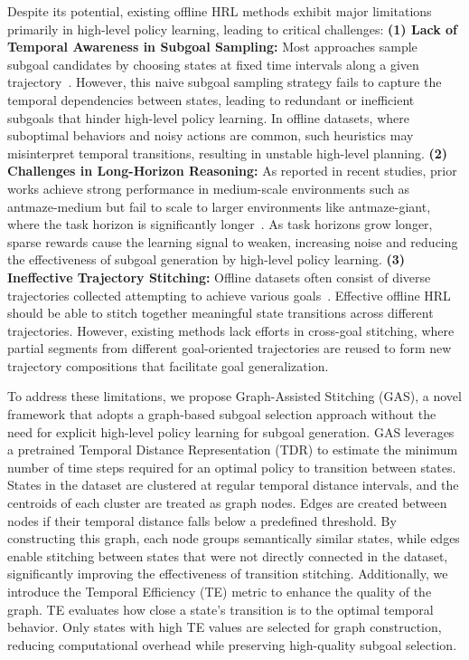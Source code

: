 \documentclass{article}
\begin{document}
Despite its potential, existing offline HRL methods exhibit major limitations primarily in high-level policy learning, leading to critical challenges: \textbf{(1) Lack of Temporal Awareness in Subgoal Sampling:} Most approaches sample subgoal candidates by choosing states at fixed time intervals along a given trajectory~\cite{park2023hiql, shin2023guide}. However, this naive subgoal sampling strategy fails to capture the temporal dependencies between states, leading to redundant or inefficient subgoals that hinder high-level policy learning. In offline datasets, where suboptimal behaviors and noisy actions are common, such heuristics may misinterpret temporal transitions, resulting in unstable high-level planning. \textbf{(2) Challenges in Long-Horizon Reasoning:} As reported in recent studies, prior works achieve strong performance in medium-scale environments such as antmaze-medium but fail to scale to larger environments like antmaze-giant, where the task horizon is significantly longer~\cite{park2025ogbench, sobal2025latent}. As task horizons grow longer, sparse rewards cause the learning signal to weaken, increasing noise and reducing the effectiveness of subgoal generation by high-level policy learning. \textbf{(3) Ineffective Trajectory Stitching:} Offline datasets often consist of diverse trajectories collected attempting to achieve various goals~\cite{park2025ogbench, park2025flow}. Effective offline HRL should be able to stitch together meaningful state transitions across different trajectories. However, existing methods lack efforts in cross-goal stitching, where partial segments from different goal-oriented trajectories are reused to form new trajectory compositions that facilitate goal generalization. 

To address these limitations, we propose Graph-Assisted Stitching (GAS), a novel framework that adopts a graph-based subgoal selection approach without the need for explicit high-level policy learning for subgoal generation. GAS leverages a pretrained Temporal Distance Representation (TDR) to estimate the minimum number of time steps required for an optimal policy to transition between states. States in the dataset are clustered at regular temporal distance intervals, and the centroids of each cluster are treated as graph nodes. Edges are created between nodes if their temporal distance falls below a predefined threshold. By constructing this graph, each node groups semantically similar states, while edges enable stitching between states that were not directly connected in the dataset, significantly improving  the effectiveness of transition stitching. Additionally, we introduce the Temporal Efficiency (TE) metric to enhance the quality of the graph. TE evaluates how close a state’s transition is to the optimal temporal behavior. Only states with high TE values are selected for graph construction, reducing computational overhead while preserving high-quality subgoal selection. 
\end{document}
